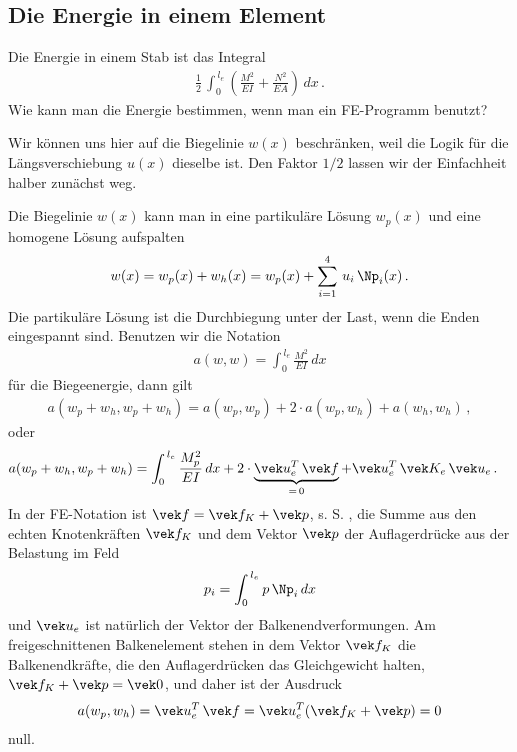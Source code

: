 {\textcolor{blau2}{\section{Die Energie in einem Element}}}
Die Energie in einem Stab ist das Integral
\begin{align}
\frac{1}{2}\,\int_0^{\,l_e} (\frac{M^2}{EI} + \frac{N^2}{EA})\,dx\,.
\end{align}
Wie kann man die Energie bestimmen, wenn man ein FE-Programm benutzt?

Wir k\"{o}nnen uns hier auf die Biegelinie $w(x)$ beschr\"{a}nken, weil die Logik f\"{u}r die L\"{a}ngsverschiebung $u(x)$  dieselbe ist. Den Faktor $1/2$ lassen wir der Einfachheit halber zun\"{a}chst weg.

Die Biegelinie $w(x)$ kann man in eine partikul\"{a}re L\"{o}sung $w_p(x)$ und eine homogene L\"{o}sung aufspalten
\begin{align}
w(x) = w_p(x) + w_h(x) = w_p(x) + \sum_{i = 1}^4\,u_i\,\Np_i(x)\,.
\end{align}
Die partikul\"{a}re L\"{o}sung ist die Durchbiegung unter der Last, wenn die Enden eingespannt sind. Benutzen wir die Notation
\begin{align}
a(w,w) = \int_0^{\,l_e} \frac{M^2}{EI}\,dx
\end{align}
f\"{u}r die Biegeenergie, dann gilt
\begin{align}
a(w_p + w_h,w_p + w_h) = a(w_p,w_p) + 2 \cdot a(w_p,w_h) + a(w_h,w_h)\,,
\end{align}
oder
\begin{align}
a(w_p + w_h,w_p + w_h) &= \int_0^{\,l_e} \frac{M_p^2}{EI}\,dx + 2\cdot \underbrace{\vek u_e^T\,\vek f}_{= \,0} + \vek u_e^T\,\vek K_e\,\vek u_e\,.
\end{align}
In der FE-Notation ist $\vek f = \vek f_K + \vek p$, s. S. \pageref{Eq67}, die Summe aus den echten Knotenkr\"{a}ften $\vek f_K$ und dem Vektor $\vek p$ der Auflagerdr\"{u}cke aus der Belastung im Feld
\begin{align}
p_i = \int_0^{\,l_e} p\,\Np_i\,dx
\end{align}
und $\vek u_e$ ist nat\"{u}rlich der Vektor der Balkenendverformungen. Am freigeschnittenen Balkenelement stehen in dem Vektor $\vek f_K$ die Balkenendkr\"{a}fte, die den Auflagerdr\"{u}cken das Gleichgewicht halten, $\vek f_K + \vek p = \vek 0$, und daher ist der Ausdruck
\begin{align} \label{Eq64}
a(w_p,w_h) = \vek u_e^T\,\vek f = \vek u_e^T (\vek f_K + \vek p) = 0
\end{align}
null.

